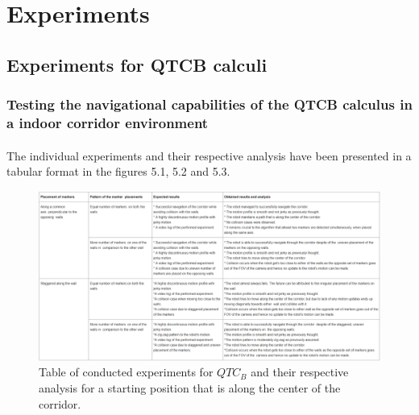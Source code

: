  

\section{Experiments}
 
\subsection{Experiments for QTCB calculi}
\subsubsection{Testing the navigational capabilities of the QTCB calculus in a indoor corridor environment} 
\paragraph{}The individual experiments and their respective analysis have been presented in a tabular format in the figures 5.1, 5.2 and 5.3.

\begin{figure}
	\includegraphics[scale = 0.6]{images/center}
	\caption{Table of conducted experiments for $QTC_B$ and their respective analysis for a starting position that is along the center of the corridor.}
	\label{fig:center}
\end{figure}


